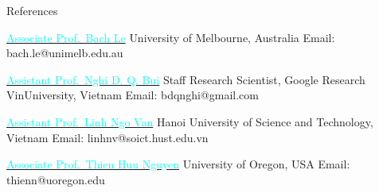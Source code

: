 \documentclass{resume} %
\begin{document}
\begin{rSection}{References}

\begin{minipage}[t]{0.48\textwidth}
    \begin{rReference}
        {\href{https://xuanbachle.github.io/}
        {\textcolor{cyan}{Associate Prof.\ Bach Le}}}
        {University of Melbourne, Australia}
        {Email: bach.le@unimelb.edu.au}
        {}
    \end{rReference}

    \vspace{0.6em}

    \begin{rReference}
        {\href{https://bdqnghi.github.io/}
        {\textcolor{cyan}{Assistant Prof.\ Nghi D. Q. Bui}}}
        {Staff Research Scientist, Google Research\\VinUniversity, Vietnam}
        {Email: bdqnghi@gmail.com}
        {}
    \end{rReference}
\end{minipage}
\hfill
\begin{minipage}[t]{0.48\textwidth}

    \begin{rReference}
        {\href{https://users.soict.hust.edu.vn/linhnv/}
        {\textcolor{cyan}{Assistant Prof.\ Linh Ngo Van}}}
        {Hanoi University of Science and Technology, Vietnam}
        {Email: linhnv@soict.hust.edu.vn}
        {}
    \end{rReference}

    \vspace{0.6em}

    \begin{rReference}
        {\href{https://ix.cs.uoregon.edu/~thien/}
        {\textcolor{cyan}{Associate Prof.\ Thien Huu Nguyen}}}
        {University of Oregon, USA}
        {Email: thienn@uoregon.edu}
        {}
    \end{rReference}
\end{minipage}

\end{rSection}
\fi
\end{document}

